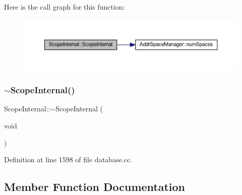 Here is the call graph for this function\+:
\nopagebreak
\begin{figure}[H]
\begin{center}
\leavevmode
\includegraphics[width=350pt]{class_scope_internal_af6d824ff10ab3f9afcdfc1ffb206227b_cgraph}
\end{center}
\end{figure}
\mbox{\label{class_scope_internal_a176aa80371fedd10ec46d43667a44420}} 
\subsubsection{\texorpdfstring{$\sim$ScopeInternal()}{~ScopeInternal()}}
{\footnotesize\ttfamily Scope\+Internal\+::$\sim$\+Scope\+Internal (\begin{DoxyParamCaption}\item[{void}]{ }\end{DoxyParamCaption})\hspace{0.3cm}{\ttfamily [virtual]}}



Definition at line 1598 of file database.\+cc.



\subsection{Member Function Documentation}
\mbox{\label{class_scope_internal_abd7bd6f565efa0e9eb5a7415fab0fca5}} 
